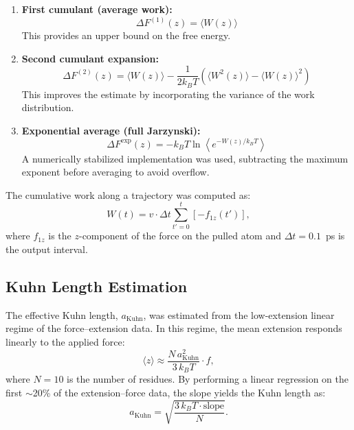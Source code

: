 \documentclass[12pt]{article}
\begin{document}
\begin{enumerate}
    \item \textbf{First cumulant (average work):}
    \begin{equation}
        \Delta F^{(1)}(z) = \langle W(z) \rangle
    \end{equation}
    This provides an upper bound on the free energy.
    
    \item \textbf{Second cumulant expansion:}
    \begin{equation}
        \Delta F^{(2)}(z) = \langle W(z) \rangle - \frac{1}{2 k_B T} \left( \langle W^2(z) \rangle - \langle W(z) \rangle^2 \right)
    \end{equation}
    This improves the estimate by incorporating the variance of the work distribution.
    
    \item \textbf{Exponential average (full Jarzynski):}
    \begin{equation}
        \Delta F^{\mathrm{exp}}(z) = -k_B T \ln \left\langle e^{-W(z) / k_B T} \right\rangle
    \end{equation}
    A numerically stabilized implementation was used, subtracting the maximum exponent before averaging to avoid overflow.
\end{enumerate}

The cumulative work along a trajectory was computed as:
\begin{equation}
    W(t) = v \cdot \Delta t \sum_{t'=0}^{t} \left[ -f_{1z}(t') \right],
\end{equation}
where $f_{1z}$ is the $z$-component of the force on the pulled atom and $\Delta t = 0.1$~ps is the output interval.

\subsection{Kuhn Length Estimation}

The effective Kuhn length, $a_\mathrm{Kuhn}$, was estimated from the low-extension linear regime of the force--extension data. In this regime, the mean extension responds linearly to the applied force:
\begin{equation}
    \langle z \rangle \approx \frac{N \, a_\mathrm{Kuhn}^2}{3 \, k_B T} \cdot f,
\end{equation}
where $N = 10$ is the number of residues. By performing a linear regression on the first $\sim$20\% of the extension--force data, the slope yields the Kuhn length as:
\begin{equation}
    a_\mathrm{Kuhn} = \sqrt{\frac{3 \, k_B T \cdot \mathrm{slope}}{N}}.
\end{equation}
\end{document}

